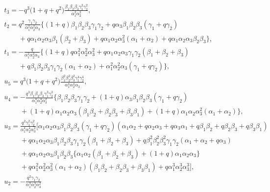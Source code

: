\documentclass[pdftex]{sigma}
\numberwithin{equation}{section}
\theoremstyle{definition}
\begin{document}
\begin{gather*}
t_3 = -q^3\bigl(1+q+q^2\bigr) \frac{\beta_1\beta_2\beta_3\gamma_1^2\gamma_2^2}{\alpha_1^2\alpha_2^2}, \\
t_2 = q^2\frac{\gamma_1\gamma_2}{\alpha_1^2\alpha_2^2\alpha_3}
\bigl\{ (1 + q)\beta_1\beta_2\beta_3\gamma_1\gamma_2 + q\alpha_3\beta_1\beta_2\beta_3(\gamma_1 + q\gamma_2) \\
\phantom{t_2 =}{} + q\alpha_1\alpha_2\alpha_3\beta_1(\beta_2 + \beta_3) + q\alpha_1\alpha_2\alpha_3^2(\alpha_1 + \alpha_2) + q\alpha_1\alpha_2\alpha_3\beta_2\beta_3 \bigr\}, \\
t_1 = -\frac{q}{\alpha_1^2\alpha_2^2\alpha_3}
\bigl\{ (1 + q)q\alpha_1^2\alpha_2^2\alpha_3^2 + q\alpha_1\alpha_2\alpha_3\gamma_1\gamma_2(\beta_1 + \beta_2 + \beta_3) \\
\phantom{t_1 =}{} + q\beta_1\beta_2\beta_3\gamma_1\gamma_2(\alpha_1 + \alpha_2) + \alpha_1^2\alpha_2^2\alpha_3(\gamma_1 + q\gamma_2) \bigr\}, \\
u_5 = q^3 \bigl(1+q+q^2\bigr) \frac{\beta_1^2\beta_2^2\beta_3^2\gamma_1^4\gamma_2^4}{\alpha_1^4\alpha_2^4\alpha_3}, \\
u_4 = -\frac{q^3\beta_1\beta_2\beta_3\gamma_1^3\gamma_2^3}{\alpha_1^4\alpha_2^4\alpha_3^2}
\bigl\{ \beta_1\beta_2\beta_3\gamma_1\gamma_2 + (1 + q)\alpha_3\beta_1\beta_2\beta_3(\gamma_1 + q\gamma_2) \\
\phantom{u_4 =}{} + (1 + q)\alpha_1\alpha_2\alpha_3(\beta_1\beta_2 + \beta_2\beta_3 + \beta_3\beta_1) + (1 + q)\alpha_1\alpha_2\alpha_3^2(\alpha_1 + \alpha_2) \bigr\}, \\
u_3 = \frac{q^2\gamma_1^2\gamma_2^2}{\alpha_1^4\alpha_2^4\alpha_3^2}
\big[ \alpha_1\alpha_2\alpha_3\beta_1\beta_2\beta_3(\gamma_1 + q\gamma_2)(\alpha_1\alpha_2 + q\alpha_2\alpha_3 + q\alpha_3\alpha_1 + q\beta_1\beta_2 + q\beta_2\beta_3 +q\beta_3\beta_1) \\
\phantom{u_3 =}{} + q\alpha_1\alpha_2\alpha_3\beta_1\beta_2\beta_3\gamma_1\gamma_2(\beta_1 + \beta_2 + \beta_3)
+ q\beta_1^2\beta_2^2\beta_3^2\gamma_1\gamma_2(\alpha_1 + \alpha_2 + q\alpha_3) \\
\phantom{u_3 =}{} + q\alpha_1\alpha_2\alpha_3\beta_1\beta_2\beta_3 \{\alpha_1\alpha_2(\beta_1 + \beta_2 + \beta_3) + (1 + q)\alpha_1\alpha_2\alpha_3 \} \\
\phantom{u_3 =}{} + q\alpha_1^2\alpha_2^2\alpha_3^2(\alpha_1 + \alpha_2)(\beta_1\beta_2 + \beta_2\beta_3 + \beta_3\beta_1) + q\alpha_1^3\alpha_2^3\alpha_3^3 \big], \\
u_2 = -\frac{q^2\gamma_1\gamma_2}{\alpha_1^3\alpha_2^3\alpha_3^2}

\end{gather*}
\end{document}
